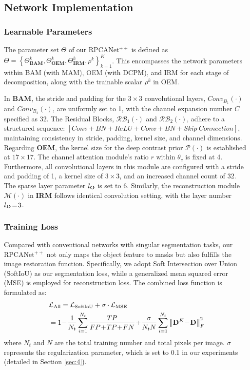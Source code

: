 \documentclass[10pt,journal,compsoc]{IEEEtran}
\begin{document}
\subsection{Network Implementation} 
\subsubsection{Learnable Parameters}
The parameter set $\Theta$ of our RPCANet$^{++}$ is defined as $\Theta  = \left\{ {\Theta _{\mathbf{BAM}}^k,\Theta _{\mathbf{OEM}}^k,\Theta _{\mathbf{IRM}}^k,{\rho ^k}} \right\}_{k = 1}^K$. This encompasses the network parameters within BAM (with MAM), OEM (with DCPM), and IRM for each stage of decomposition, along with the trainable scalar $\rho^{k}$ in OEM. 

In \textbf{BAM}, the stride and padding for the $3\times 3$ convolutional layers, $Conv_{B_1}(\cdot)$ and $Conv_{B_2}(\cdot)$, are uniformly set to 1, with the channel expansion number $C$ specified as 32. The Residual Blocks, $\mathcal{RB}_1(\cdot)$ and $\mathcal{RB}_2(\cdot)$, adhere to a structured sequence: $[Conv + BN + ReLU + Conv + BN + Skip ~Connection]$, maintaining consistency in stride, padding, kernel size, and channel dimensions. Regarding \textbf{OEM}, the kernel size for the deep contrast prior $\mathcal{P}(\cdot)$ is established at $17\!\times\!17$. The channel attention module's ratio $r$ within $\theta_c$ is fixed at 4. Furthermore, all convolutional layers in this module are configured with a stride and padding of 1, a kernel size of $3\!\times\!3$, and an increased channel count of 32. The sparse layer parameter $l_{\bf{O}}$ is set to 6. Similarly, the reconstruction module $\mathcal{M}(\cdot)$ in \textbf{IRM} follows identical convolution setting, with the layer number $l_{\bf{D}}\!=\!3$.
\subsubsection{Training Loss}
Compared with conventional networks with singular segmentation tasks, our RPCANet$^{++}$ not only maps the object feature to masks but also fulfills the image restoration function. Specifically, we adopt Soft Intersection over Union (SoftIoU) \cite{huang-2020-softiou} as our segmentation loss, while a generalized mean squared error (MSE) is employed for reconstruction loss. The combined loss function is formulated as:
\begin{equation}
\setlength{\abovedisplayskip}{3pt}
\setlength{\belowdisplayskip}{2pt}
\begin{aligned}
&{{\mathcal{L}}_{{\text{All}}}} = \mathcal{L}_\text{SoftIoU} + \sigma  \cdot {\mathcal{L}_\text{MSE}}\enspace \\
&=1 \!-\!\frac{1}{{{N_t}}}\sum\limits_{i = 1}^{{N_t}}{\frac{{TP}}{{FP\!+\!TP\!+\!FN}}}\!+\!\frac{ \sigma }{{{N_t}N}}\sum\limits_{i = 1}^{{N_t}} {\left\| {{\mathbf{D}^K}\!-\!\mathbf{D}} \right\|_F^2} 
\end{aligned}
\end{equation}
where $N_t$ and $N$ are the total training number and total pixels per image. $\sigma$ represents the regularization parameter, which is set to 0.1 in our experiments (detailed in Section \ref{sec:4}).
\end{document}
